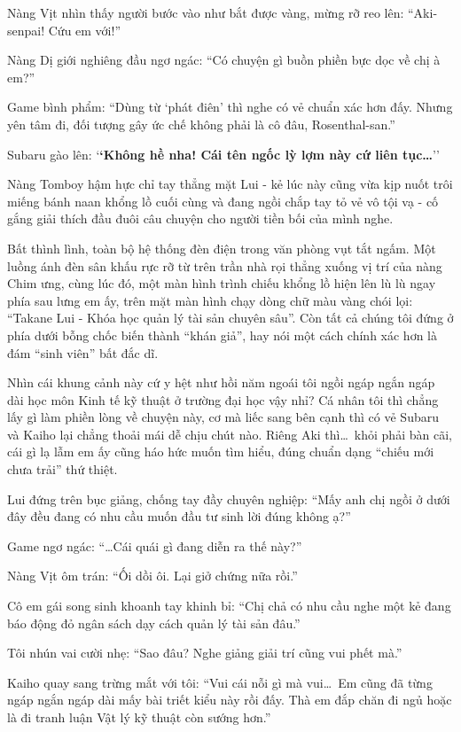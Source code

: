 \documentclass[../main.tex]{subfiles}
\begin{document}
Nàng Vịt nhìn thấy người bước vào như bắt được vàng, mừng rỡ reo lên: ``Aki-senpai! Cứu em với!''

Nàng Dị giới nghiêng đầu ngơ ngác: ``Có chuyện gì buồn phiền bực dọc về chị à em?''

Game bình phẩm: ``Dùng từ `phát điên' thì nghe có vẻ chuẩn xác hơn đấy. Nhưng yên tâm đi, đối tượng gây ức chế không phải là cô đâu, Rosenthal-san.''

Subaru gào lên: `\textbf{`Không hề nha! Cái tên ngốc lỳ lợm này cứ liên tục\dots}''

Nàng Tomboy hậm hực chỉ tay thẳng mặt Lui - kẻ lúc này cũng vừa kịp nuốt trôi miếng bánh naan khổng lồ cuối cùng và đang ngồi chắp tay tỏ vẻ vô tội vạ - cố gắng giải thích đầu đuôi câu chuyện cho người tiền bối của mình nghe.

Bất thình lình, toàn bộ hệ thống đèn điện trong văn phòng vụt tắt ngấm. Một luồng ánh đèn sân khấu rực rỡ từ trên trần nhà rọi thẳng xuống vị trí của nàng Chim ưng, cùng lúc đó, một màn hình trình chiếu khổng lồ hiện lên lù lù ngay phía sau lưng em ấy, trên mặt màn hình chạy dòng chữ màu vàng chói lọi: ``Takane Lui - Khóa học quản lý tài sản chuyên sâu''. Còn tất cả chúng tôi đứng ở phía dưới bỗng chốc biến thành ``khán giả'', hay nói một cách chính xác hơn là đám ``sinh viên'' bất đắc dĩ.


Nhìn cái khung cảnh này cứ y hệt như hồi năm ngoái tôi ngồi ngáp ngắn ngáp dài học môn Kinh tế kỹ thuật ở trường đại học vậy nhỉ? Cá nhân tôi thì chẳng lấy gì làm phiền lòng về chuyện này, cơ mà liếc sang bên cạnh thì có vẻ Subaru và Kaiho lại chẳng thoải mái dễ chịu chút nào. Riêng Aki thì\dots\ khỏi phải bàn cãi, cái gì lạ lẫm em ấy cũng háo hức muốn tìm hiểu, đúng chuẩn dạng ``chiếu mới chưa trải'' thứ thiệt.

Lui đứng trên bục giảng, chống tay đầy chuyên nghiệp: ``Mấy anh chị ngồi ở dưới đây đều đang có nhu cầu muốn đầu tư sinh lời đúng không ạ?''

Game ngơ ngác: ``\dots Cái quái gì đang diễn ra thế này?''

Nàng Vịt ôm trán: ``Ối dồi ôi. Lại giở chứng nữa rồi.''

Cô em gái song sinh khoanh tay khinh bỉ: ``Chị chả có nhu cầu nghe một kẻ đang báo động đỏ ngân sách dạy cách quản lý tài sản đâu.''

Tôi nhún vai cười nhẹ: ``Sao đâu? Nghe giảng giải trí cũng vui phết mà.''

Kaiho quay sang trừng mắt với tôi: ``Vui cái nỗi gì mà vui\dots\ Em cũng đã từng ngáp ngắn ngáp dài mấy bài triết kiểu này rồi đấy. Thà em đắp chăn đi ngủ hoặc là đi tranh luận Vật lý kỹ thuật còn sướng hơn.''
\end{document}
